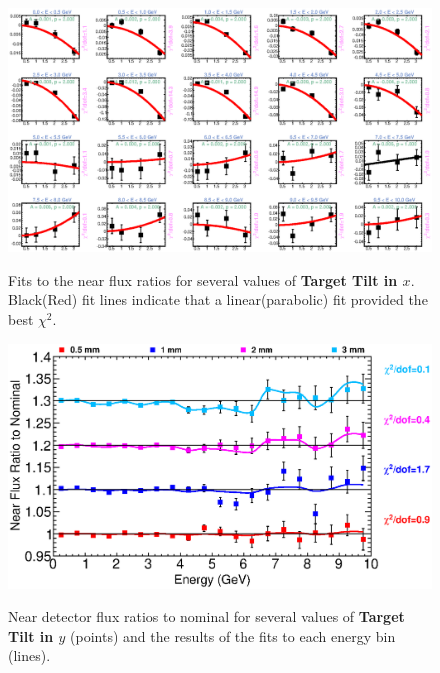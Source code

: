 {\begin{figure}[ht]
  \begin{center}
    {\includegraphics[width=5.0in]{figures/TargetXTilt_near_fits.eps}}
  \end{center}
\caption{ Fits to the near flux ratios for several values of {\bf Target Tilt in $x$}. Black(Red) fit lines indicate that a linear(parabolic) fit provided the best $\chi^2$. }
\end{figure}

\clearpage

\begin{figure}[ht]
  \begin{center}
    {\includegraphics[width=6.0in]{figures/TargetYTilt_near_summary.eps}}
  \end{center}
\caption{ Near detector flux ratios to nominal for several values of {\bf Target Tilt in $y$} (points) and the results of the fits to each energy bin (lines).}
\end{figure}

}
